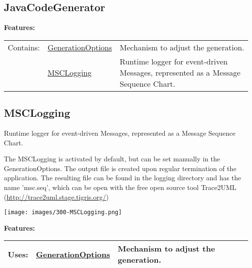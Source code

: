 	
	\vspace{\baselineskip}
	\vspace{\baselineskip}
	\vspace{\baselineskip}
	
\subsection{JavaCodeGenerator}
	\hypertarget{ref:JavaCodeGenerator}{}
		
		
		
	\begingroup
	\textbf{Features:}
	\renewcommand{\arraystretch}{1.8} %
	\begin{longtable}{l|l p{}}
		\hline
	Contains: & \tabitem \hyperlink{ref:GenerationOptions}{GenerationOptions}  & Mechanism to adjust the generation.\\
	& \tabitem \hyperlink{ref:MSCLogging}{MSCLogging}  & Runtime logger for event-driven Messages, represented as a Message Sequence Chart. \\
	\hline
	\end{longtable}
	\endgroup
		
		
	
	\vspace{\baselineskip}
	\vspace{\baselineskip}
	\vspace{\baselineskip}
	
\subsection{MSCLogging}
	\hypertarget{ref:MSCLogging}{}
	Runtime logger for event-driven Messages, represented as a Message Sequence Chart.
		
		The MSCLogging is activated by default, but can be set manually in the GenerationOptions.
		The output file is created upon regular termination of the application.
		The resulting file can be found in the logging directory and has the name 'msc.seq', which can be open with the free open source tool Trace2UML (\url{http://trace2uml.stage.tigris.org/})
	
		\texttt{[image: images/300-MSCLogging.png]}
		
		
	\begingroup
	\textbf{Features:}
	\renewcommand{\arraystretch}{1.8} %
	\begin{longtable}{l|l p{}}
		\hline
	Uses: & \tabitem \hyperlink{ref:GenerationOptions}{GenerationOptions}  & Mechanism to adjust the generation.\\
	\hline
	\end{longtable}
	\endgroup
		
